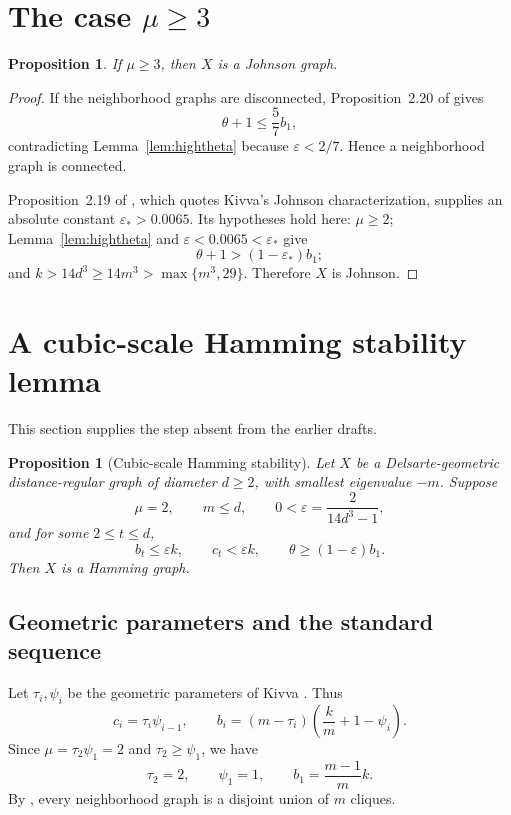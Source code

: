 \documentclass[11pt]{amsart}
\newtheorem{proposition}[theorem]{Proposition}
\theoremstyle{definition}
\newcommand{\eps}{\varepsilon}
\begin{document}
\section{The case $\mu\ge3$}
\begin{proposition}\label{prop:johnson}
If $\mu\ge3$, then $X$ is a Johnson graph.
\end{proposition}

\begin{proof}
If the neighborhood graphs are disconnected, Proposition~2.20 of \cite{PS} gives
\[
 \theta+1\le\frac57b_1,
\]
contradicting Lemma~\ref{lem:hightheta} because $\eps<2/7$.  Hence a neighborhood graph is connected.

Proposition~2.19 of \cite{PS}, which quotes Kivva's Johnson characterization, supplies an absolute constant $\eps_*>0.0065$.  Its hypotheses hold here: $\mu\ge2$; Lemma~\ref{lem:hightheta} and $\eps<0.0065<\eps_*$ give
\[
 \theta+1>(1-\eps_*)b_1;
\]
and $k>14d^3\ge14m^3>\max\{m^3,29\}$.  Therefore $X$ is Johnson.
\end{proof}

\section{A cubic-scale Hamming stability lemma}\label{sec:hamming}
This section supplies the step absent from the earlier drafts.

\begin{proposition}[Cubic-scale Hamming stability]\label{prop:hamming}
Let $X$ be a Delsarte-geometric distance-regular graph of diameter $d\ge2$, with smallest eigenvalue $-m$.  Suppose
\[
 \mu=2,
 \qquad
 m\le d,
 \qquad
 0<\eps=\frac2{14d^3-1},
\]
and for some $2\le t\le d$,
\[
 b_t\le\eps k,
 \qquad
 c_t<\eps k,
 \qquad
 \theta\ge(1-\eps)b_1.
\]
Then $X$ is a Hamming graph.
\end{proposition}

\subsection{Geometric parameters and the standard sequence}
Let $\tau_i,\psi_i$ be the geometric parameters of Kivva \cite[Lemma~2.16]{Kivva}.  Thus
\begin{equation}\label{eq:geometricparams}
 c_i=\tau_i\psi_{i-1},
 \qquad
 b_i=(m-\tau_i)\left(\frac{k}{m}+1-\psi_i\right).
\end{equation}
Since $\mu=\tau_2\psi_1=2$ and $\tau_2\ge\psi_1$, we have
\begin{equation}\label{eq:mu2params}
 \tau_2=2,
 \qquad
 \psi_1=1,
 \qquad
 b_1=\frac{m-1}{m}k.
\end{equation}
By \cite[Lemma~2.19]{Kivva}, every neighborhood graph is a disjoint union of $m$ cliques.
\end{document}
